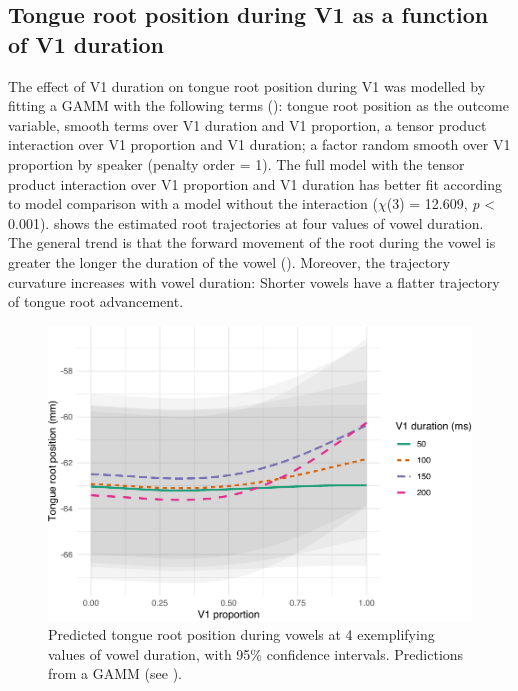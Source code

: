 \documentclass[preprint]{JASAnew}
\begin{document}
\hypertarget{tongue-root-position-during-v1-as-a-function-of-v1-duration}{%
\subsection{Tongue root position during V1 as a function of V1
duration}\label{tongue-root-position-during-v1-as-a-function-of-v1-duration}}

\label{s:trp-v1-dur}

The effect of V1 duration on tongue root position during V1 was modelled
by fitting a GAMM with the following terms
(): tongue root position as the outcome
variable, smooth terms over V1 duration and V1 proportion, a tensor
product interaction over V1 proportion and V1 duration; a factor random
smooth over V1 proportion by speaker (penalty order = 1). The full model
with the tensor product interaction over V1 proportion and V1 duration
has better fit according to model comparison with a model without the
interaction (\(\chi\)(3) = 12.609, \emph{p} \textless{} 0.001).
 shows the estimated root trajectories at four values of
vowel duration. The general trend is that the forward movement of the
root during the vowel is greater the longer the duration of the vowel
(). Moreover, the trajectory curvature increases with
vowel duration: Shorter vowels have a flatter trajectory of tongue root
advancement.

\begin{figure}
\includegraphics[width=\linewidth]{./Figure5-1} \caption{Predicted tongue root position during vowels at 4 exemplifying values of vowel duration, with 95\% confidence intervals. Predictions from a GAMM (see ).}\label{f:Figure5}
\end{figure}
\end{document}
